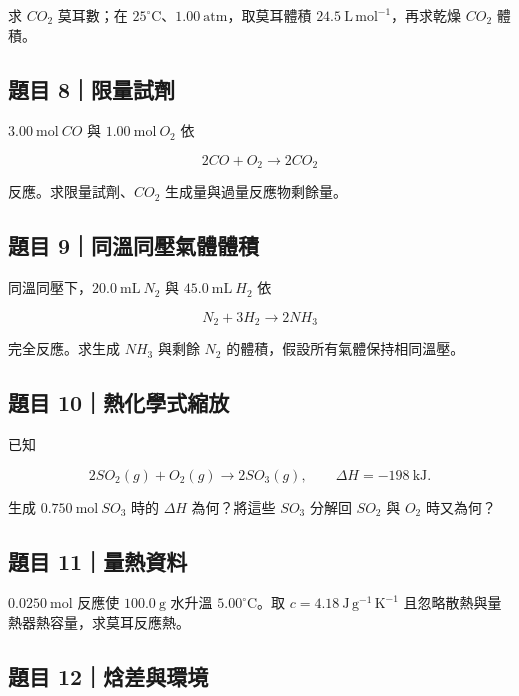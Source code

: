 \documentclass[11pt,a4paper]{article}
\begin{document}
求 \(CO_2\) 莫耳數；在 \(25^\circ\mathrm C\)、\(1.00\ \mathrm{atm}\)，取莫耳體積 \(24.5\ \mathrm{L\,mol^{-1}}\)，再求乾燥 \(CO_2\) 體積。

\subsection{題目 8｜限量試劑}\label{ux984cux76ee-8ux9650ux91cfux8a66ux5291}

\(3.00\ \mathrm{mol}\ CO\) 與 \(1.00\ \mathrm{mol}\ O_2\) 依

\[
2CO+O_2\rightarrow2CO_2
\]

反應。求限量試劑、\(CO_2\) 生成量與過量反應物剩餘量。

\subsection{題目 9｜同溫同壓氣體體積}\label{ux984cux76ee-9ux540cux6eabux540cux58d3ux6c23ux9ad4ux9ad4ux7a4d}

同溫同壓下，\(20.0\ \mathrm{mL}\ N_2\) 與 \(45.0\ \mathrm{mL}\ H_2\) 依

\[
N_2+3H_2\rightarrow2NH_3
\]

完全反應。求生成 \(NH_3\) 與剩餘 \(N_2\) 的體積，假設所有氣體保持相同溫壓。

\subsection{題目 10｜熱化學式縮放}\label{ux984cux76ee-10ux71b1ux5316ux5b78ux5f0fux7e2eux653e}

已知

\[
2SO_2(g)+O_2(g)\rightarrow2SO_3(g),
\qquad\Delta H=-198\ \mathrm{kJ}.
\]

生成 \(0.750\ \mathrm{mol}\ SO_3\) 時的 \(\Delta H\) 為何？將這些 \(SO_3\) 分解回 \(SO_2\) 與 \(O_2\) 時又為何？

\subsection{題目 11｜量熱資料}\label{ux984cux76ee-11ux91cfux71b1ux8cc7ux6599}

\(0.0250\ \mathrm{mol}\) 反應使 \(100.0\ \mathrm g\) 水升溫 \(5.00^\circ\mathrm C\)。取 \(c=4.18\ \mathrm{J\,g^{-1}\,K^{-1}}\) 且忽略散熱與量熱器熱容量，求莫耳反應熱。

\subsection{題目 12｜焓差與環境}\label{ux984cux76ee-12ux7113ux5deeux8207ux74b0ux5883}
\end{document}
